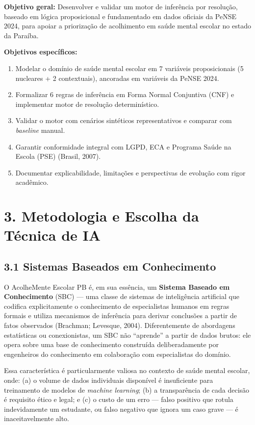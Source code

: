 \documentclass[11pt]{article}
\providecommand{\tightlist}{%
      \setlength{\itemsep}{0pt}\setlength{\parskip}{0pt}}
\begin{document}
\textbf{Objetivo geral:} Desenvolver e validar um motor de inferência
por resolução, baseado em lógica proposicional e fundamentado em dados
oficiais da PeNSE 2024, para apoiar a priorização de acolhimento em
saúde mental escolar no estado da Paraíba.

\textbf{Objetivos específicos:}

\begin{enumerate}
\def\labelenumi{\arabic{enumi}.}
\tightlist
\item
  Modelar o domínio de saúde mental escolar em 7 variáveis
  proposicionais (5 nucleares + 2 contextuais), ancoradas em variáveis
  da PeNSE 2024.
\item
  Formalizar 6 regras de inferência em Forma Normal Conjuntiva (CNF) e
  implementar motor de resolução determinístico.
\item
  Validar o motor com cenários sintéticos representativos e comparar com
  \emph{baseline} manual.
\item
  Garantir conformidade integral com LGPD, ECA e Programa Saúde na
  Escola (PSE) (Brasil, 2007).
\item
  Documentar explicabilidade, limitações e perspectivas de evolução com
  rigor acadêmico.
\end{enumerate}

    \section{3. Metodologia e Escolha da Técnica de
IA}\label{metodologia-e-escolha-da-tuxe9cnica-de-ia}

\subsection{3.1 Sistemas Baseados em
Conhecimento}\label{sistemas-baseados-em-conhecimento}

O AcolheMente Escolar PB é, em sua essência, um \textbf{Sistema Baseado
em Conhecimento} (SBC) --- uma classe de sistemas de inteligência
artificial que codifica explicitamente o conhecimento de especialistas
humanos em regras formais e utiliza mecanismos de inferência para
derivar conclusões a partir de fatos observados (Brachman; Levesque,
2004). Diferentemente de abordagens estatísticas ou conexionistas, um
SBC não ``aprende'' a partir de dados brutos: ele opera sobre uma base
de conhecimento construída deliberadamente por engenheiros do
conhecimento em colaboração com especialistas do domínio.

Essa característica é particularmente valiosa no contexto de saúde
mental escolar, onde: (a) o volume de dados individuais disponível é
insuficiente para treinamento de modelos de \emph{machine learning}; (b)
a transparência de cada decisão é requisito ético e legal; e (c) o custo
de um erro --- falso positivo que rotula indevidamente um estudante, ou
falso negativo que ignora um caso grave --- é inaceitavelmente alto.
\end{document}
